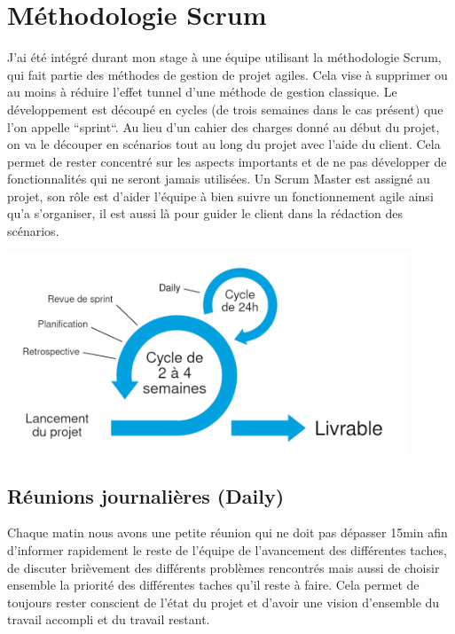 \documentclass[12pt, a4paper]{report}
\begin{document}
        \section{Méthodologie Scrum}
            J'ai été intégré durant mon stage à une équipe utilisant la méthodologie Scrum, qui fait partie des méthodes de gestion de projet agiles. Cela vise à supprimer ou au moins à réduire l'effet tunnel d'une méthode de gestion classique.\newline
            Le développement est découpé en cycles (de trois semaines dans le cas présent) que l'on appelle ``sprint``.\newline
            Au lieu d'un cahier des charges donné au début du projet, on va le découper en scénarios tout au long du projet avec l'aide du client.\newline
            Cela permet de rester concentré sur les aspects importants et de ne pas développer de fonctionnalités qui ne seront jamais utilisées.\newline
            Un Scrum Master est assigné au projet, son rôle est d'aider l'équipe à bien suivre un fonctionnement agile ainsi qu'a s'organiser, il est aussi là pour guider le client dans la rédaction des scénarios.
            \begin{center}
                \includegraphics[width=0.9\textwidth]{scrum.jpg}
            \end{center}
            \subsection{Réunions journalières (Daily)}
                Chaque matin nous avons une petite réunion qui ne doit pas dépasser 15min afin d'informer rapidement le reste de l'équipe de l'avancement des différentes taches, de discuter brièvement des différents problèmes rencontrés mais aussi de choisir ensemble la priorité des différentes taches qu'il reste à faire.\newline
                Cela permet de toujours rester conscient de l'état du projet et d'avoir une vision d'ensemble du travail accompli et du travail restant.
\end{document}
